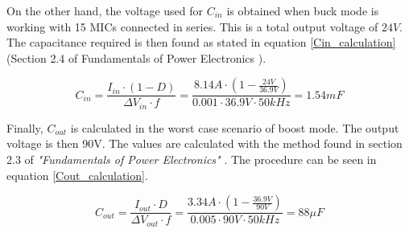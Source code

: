 On the other hand, the voltage used for $C_{in}$  is obtained when buck mode is working with 15 MICs connected in series. This is a total output voltage of $24 V$.
The capacitance required is then found as stated in equation \ref{Cin_calculation} (Section 2.4 of Fundamentals of Power Electronics \cite{Erickson}).

\begin{equation} \label{Cin_calculation}
C_{in} = \frac{I_{in} \cdot (1 - D)}{\Delta V_{in} \cdot f} = \frac{8.14 A \cdot ( 1 - \frac{24 V}{36.9 V})}{0.001 \cdot 36.9 V \cdot 50 kHz} = 1.54 mF
\end{equation}

Finally, $C_{out}$ is calculated in the worst case scenario of boost mode. The output voltage is then 90V. The values are calculated with the method found in section 2.3 of \textit{"Fundamentals of Power Electronics"} \cite{Erickson}. The procedure can be seen in equation \ref{Cout_calculation}.

\begin{equation} \label{Cout_calculation}
C_{out} = \frac{I_{out} \cdot D}{\Delta V_{out} \cdot f} = \frac{3.34 A \cdot ( 1 - \frac{36.9 V}{90 V})}{0.005 \cdot 90 V \cdot 50 kHz} = 88 \mu F
\end{equation}
   
